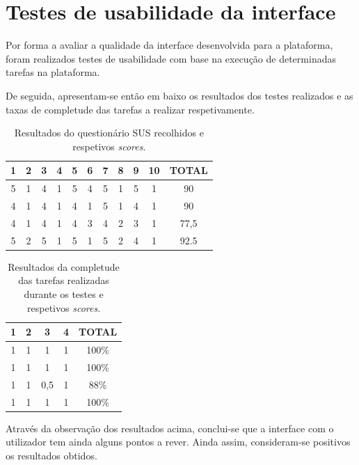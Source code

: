 \newpage
\section{Testes de usabilidade da interface}

Por forma a avaliar a qualidade da interface desenvolvida para a plataforma, foram realizados testes de usabilidade com base na execução de determinadas tarefas na plataforma.

De seguida, apresentam-se então em baixo os resultados dos testes realizados e as taxas de completude das tarefas a realizar respetivamente.

\begin{table}[H]
\centering
\caption{Resultados do questionário SUS recolhidos e respetivos \textit{scores}.}
\begin{tabular}{ccccccccccc}
\hline
\rowcolor[HTML]{EFEFEF} 
\textbf{1} & \textbf{2} & \textbf{3} & \textbf{4} & \textbf{5} & \textbf{6} & \textbf{7} & \textbf{8} & \textbf{9} & \textbf{10} & \textbf{TOTAL} \\ \hline
5          & 1          & 4          & 1          & 5          & 4          & 5          & 1          & 5          & 1           & 90             \\
4          & 1          & 4          & 1          & 4          & 1          & 5          & 1          & 4          & 1           & 90             \\
4          & 1          & 4          & 1          & 4          & 3          & 4          & 2          & 3          & 1           & 77,5           \\
5          & 2          & 5          & 1          & 5          & 1          & 5          & 2          & 4          & 1           & 92.5           \\ \hline
\end{tabular}
\end{table}

\begin{table}[H]
\centering
\caption{Resultados da completude das tarefas realizadas durante os testes e respetivos \textit{scores}.}
\begin{tabular}{ccccc}
\hline
\rowcolor[HTML]{EFEFEF} 
\textbf{1} & \textbf{2} & \textbf{3} & \textbf{4} & \textbf{TOTAL} \\ \hline
1          & 1          & 1          & 1          & 100\%          \\
1          & 1          & 1          & 1          & 100\%          \\
1          & 1          & 0,5        & 1          & 88\%           \\
1          & 1          & 1          & 1          & 100\%          \\ \hline
\end{tabular}
\end{table}

Através da observação dos resultados acima, conclui-se que a interface com o utilizador tem ainda alguns pontos a rever. Ainda assim, consideram-se positivos os resultados obtidos.
